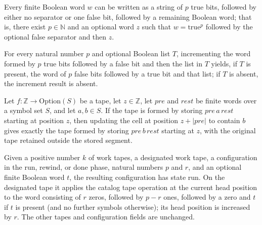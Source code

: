 \begin{lemma}
\label{Turing.catalog_increment_split}
\leanok
{}
Every finite Boolean word $w$ can be written as a string of $p$ true bits, followed by
either no separator or one false bit, followed by a remaining Boolean word; that is,
there exist $p\in\mathbb{N}$ and an optional word $z$ such that $w=\mathrm{true}^p$
followed by the optional false separator and then $z$.
\end{lemma}

\begin{lemma}
\label{Turing.catalog_increment_value}
\leanok
{}
For every natural number $p$ and optional Boolean list $T$, incrementing the word formed
by $p$ true bits followed by a false bit and then the list in $T$ yields, if $T$ is
present, the word of $p$ false bits followed by a true bit and that list; if $T$ is
absent, the increment result is absent.
\end{lemma}

\begin{lemma}
\label{Turing.catalog_write_middle}
\leanok
{}
Let $f:\mathbb{Z}\to\mathrm{Option}(S)$ be a tape, let $z\in\mathbb{Z}$, let $pre$ and
$rest$ be finite words over a symbol set $S$, and let $a,b\in S$. If the tape is formed by
storing $pre\,a\,rest$ starting at position $z$, then updating the cell at position
$z+|pre|$ to contain $b$ gives exactly the tape formed by storing $pre\,b\,rest$
starting at $z$, with the original tape retained outside the stored segment.
\end{lemma}

\begin{definition}
\label{Turing.catalogIncF}
\leanok
{}
Given a positive number $k$ of work tapes, a designated work tape, a configuration in
the run, rewind, or done phase, natural numbers $p$ and $r$, and an optional finite
Boolean word $t$, the resulting configuration has state run. On the designated tape it
applies the catalog tape operation at the current head position to the word consisting
of $r$ zeros, followed by $p-r$ ones, followed by a zero and $t$ if $t$ is present (and
no further symbols otherwise); its head position is increased by $r$. The other tapes
and configuration fields are unchanged.
\end{definition}

